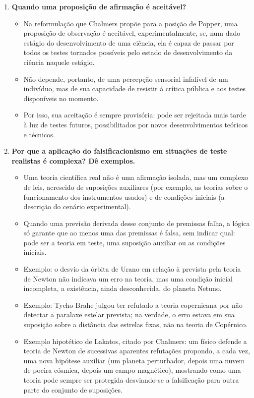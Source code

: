 \documentclass[10pt,a4paper]{extarticle}
\begin{document}
\begin{enumerate}[resume, label=\textbf{\arabic*.}, itemsep=10pt]
\item \textbf{Quando uma proposição de afirmação é aceitável?}
\begin{itemize}
  \item Na reformulação que Chalmers propõe para a posição de Popper, uma proposição de observação é aceitável, experimentalmente, se, num dado estágio do desenvolvimento de uma ciência, ela é capaz de passar por todos os testes tornados possíveis pelo estado de desenvolvimento da ciência naquele estágio.
  \item Não depende, portanto, de uma percepção sensorial infalível de um indivíduo, mas de sua capacidade de resistir à crítica pública e aos testes disponíveis no momento.
  \item Por isso, sua aceitação é sempre provisória: pode ser rejeitada mais tarde à luz de testes futuros, possibilitados por novos desenvolvimentos teóricos e técnicos.
\end{itemize}

\item \textbf{Por que a aplicação do falsificacionismo em situações de teste realistas é complexa? Dê exemplos.}
\begin{itemize}
  \item Uma teoria científica real não é uma afirmação isolada, mas um complexo de leis, acrescido de suposições auxiliares (por exemplo, as teorias sobre o funcionamento dos instrumentos usados) e de condições iniciais (a descrição do cenário experimental).
  \item Quando uma previsão derivada desse conjunto de premissas falha, a lógica só garante que ao menos uma das premissas é falsa, sem indicar qual: pode ser a teoria em teste, uma suposição auxiliar ou as condições iniciais.
  \item Exemplo: o desvio da órbita de Urano em relação à prevista pela teoria de Newton não indicava um erro na teoria, mas uma condição inicial incompleta, a existência, ainda desconhecida, do planeta Netuno.
  \item Exemplo: Tycho Brahe julgou ter refutado a teoria copernicana por não detectar a paralaxe estelar prevista; na verdade, o erro estava em sua suposição sobre a distância das estrelas fixas, não na teoria de Copérnico.
  \item Exemplo hipotético de Lakatos, citado por Chalmers: um físico defende a teoria de Newton de sucessivas aparentes refutações propondo, a cada vez, uma nova hipótese auxiliar (um planeta perturbador, depois uma nuvem de poeira cósmica, depois um campo magnético), mostrando como uma teoria pode sempre ser protegida desviando-se a falsificação para outra parte do conjunto de suposições.
\end{itemize}


\end{enumerate}
\end{document}
